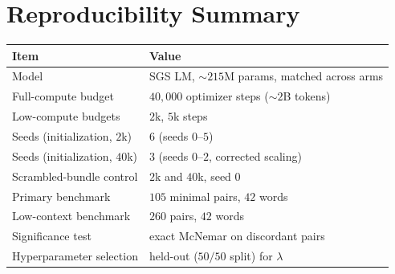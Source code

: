 \documentclass[twoside,11pt]{article}
\begin{document}
\section{Reproducibility Summary}
\label{app:repro}

\begin{center}
\begin{tabular}{ll}
\toprule
Item & Value \\
\midrule
Model & SGS LM, $\sim$$215$M params, matched across arms \\
Full-compute budget & $40{,}000$ optimizer steps ($\sim$$2$B tokens) \\
Low-compute budgets & $2$k, $5$k steps \\
Seeds (initialization, $2$k) & $6$ (seeds $0$--$5$) \\
Seeds (initialization, $40$k) & $3$ (seeds $0$--$2$, corrected scaling) \\
Scrambled-bundle control & $2$k and $40$k, seed $0$ \\
Primary benchmark & $105$ minimal pairs, $42$ words \\
Low-context benchmark & $260$ pairs, $42$ words \\
Significance test & exact McNemar on discordant pairs \\
Hyperparameter selection & held-out ($50/50$ split) for $\lambda$ \\
\bottomrule
\end{tabular}
\end{center}
\end{document}

